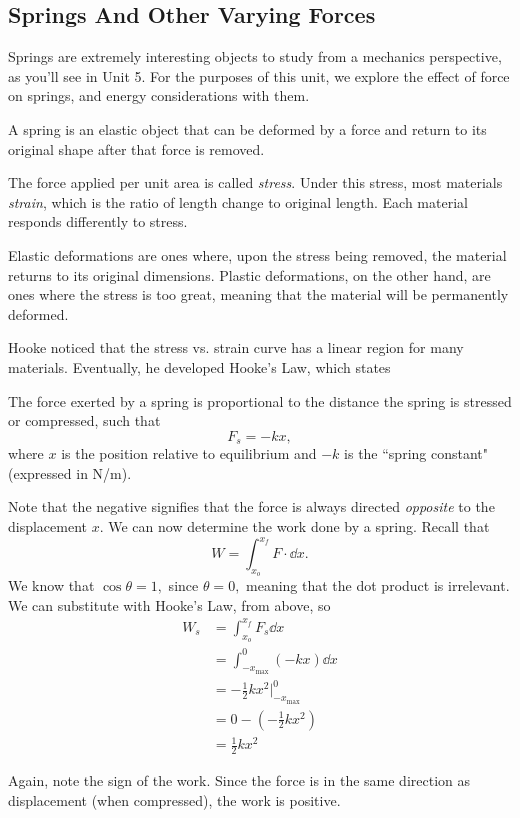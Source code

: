 \documentclass[11pt]{article}
\begin{document}
\subsection{Springs And Other Varying Forces}
Springs are extremely interesting objects to study from a mechanics perspective, as you'll see in Unit 5. For the purposes of this unit, we explore the effect of force on springs, and energy considerations with them.
\begin{defn}
	A spring is an elastic object that can be deformed by a force and return to its original shape after that force is removed.
\end{defn}
The force applied per unit area is called \textit{stress}. Under this stress, most materials \textit{strain}, which is the ratio of length change to original length. Each material responds differently to stress.
\begin{defn}
	Elastic deformations are ones where, upon the stress being removed, the material returns to its original dimensions. Plastic deformations, on the other hand, are ones where the stress is too great, meaning that the material will be permanently deformed.
\end{defn}
Hooke noticed that the stress vs. strain curve has a linear region for many materials. Eventually, he developed Hooke's Law, which states
\begin{law}
	The force exerted by a spring is proportional to the distance the spring is stressed or compressed, such that
	\[F_s = -kx,\]
	where $x$ is the position relative to equilibrium and $-k$ is the ``spring constant" (expressed in N/m).
\end{law}
Note that the negative signifies that the force is always directed \textit{opposite} to the displacement $x$. We can now determine the work done by a spring. Recall that
\[W = \int_{x_o}^{x_f} F \cdot \dd x.\]
We know that $\cos\theta = 1,$ since $\theta = 0,$ meaning that the dot product is irrelevant. We can substitute with Hooke's Law, from above, so
\begin{align*}
	W_s &= \int_{x_o}^{x_f} F_s \dd x \\
	&= \int_{-x_{\max}}^{0} (-kx) \dd x \\
	&= -\frac{1}{2} k x^2 \Big|_{-x_{\max}}^{0} \\
	&= 0 - \left(-\frac{1}{2}kx^2\right) \\
	&= \frac{1}{2}kx^2
\end{align*}
\begin{remark}
	Again, note the sign of the work. Since the force is in the same direction as displacement (when compressed), the work is positive.
\end{remark}
\end{document}
